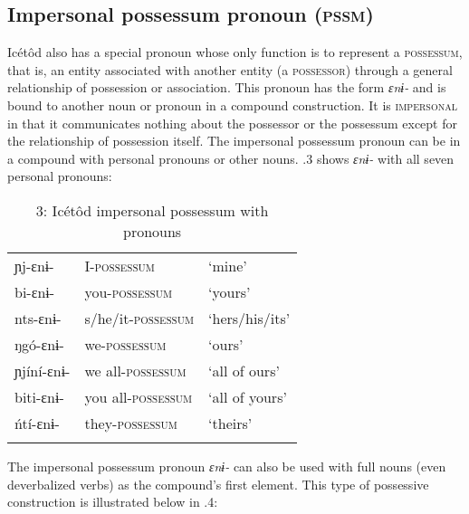 \subsection{Impersonal possessum pronoun (\textsc{pssm})}


Icétôd also has a special pronoun whose only function is to represent a \textsc{possessum}, that is, an entity associated with another entity (a \textsc{possessor}) through a general relationship of possession or association. This pronoun has the form \textit{ɛnɨ- }and is bound to another noun or pronoun in a compound construction. It is \textsc{impersonal} in that it communicates nothing about the possessor or the possessum except for the relationship of possession itself. The impersonal possessum pronoun can be in a compound with personal pronouns or other nouns. .3 shows \textit{ɛnɨ- }with all seven personal pronouns:


\begin{table}
\caption{3: Icétôd impersonal possessum with pronouns}
\label{tab:5}


\begin{tabularx}{\textwidth}{XXX}
\lsptoprule

ɲj-ɛnɨ- & I-\textsc{possessum} & ‘mine’\\
bi-ɛnɨ- & you-\textsc{possessum} & ‘yours’\\
nts-ɛnɨ- & s/he/it-\textsc{possessum} & ‘hers/his/its’\\
ŋgó-ɛnɨ- & we-\textsc{possessum} & ‘ours’\\
ɲjíní-ɛnɨ- & we all-\textsc{possessum} & ‘all of ours’\\
biti-ɛnɨ- & you all-\textsc{possessum} & ‘all of yours’\\
ńtí-ɛnɨ- & they-\textsc{possessum} & ‘theirs’\\
\lspbottomrule
\end{tabularx}
\end{table}
The impersonal possessum pronoun \textit{ɛnɨ-} can also be used with full nouns (even deverbalized verbs) as the compound’s first element. This type of possessive construction is illustrated below in .4:


